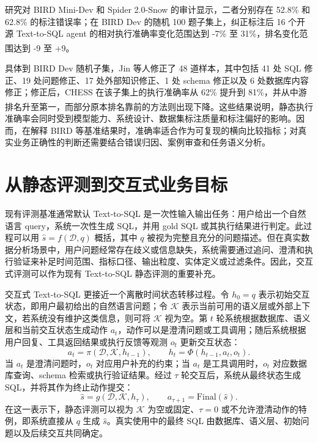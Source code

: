 \documentclass[
    bachelor,
    pdflinks,
]{xjtuthesis}
\newcommand{\upcite}[1]{\textsuperscript{\cite{#1}}}
\begin{document}
研究对 BIRD Mini-Dev 和 Spider 2.0-Snow 的审计显示，二者分别存在 52.8\% 和 62.8\% 的标注错误率；在 BIRD Dev 的随机 100 题子集上，纠正标注后 16 个开源 Text-to-SQL agent 的相对执行准确率变化范围达到 -7\% 至 31\%，排名变化范围达到 -9 至 +9\upcite{jin2026annotationErrors}。

具体到 BIRD Dev 随机子集，Jin 等人修正了 48 道样本，其中包括 41 处 SQL 修正、19 处问题修正、17 处外部知识修正、1 处 schema 修正以及 6 处数据库内容修正；修正后，CHESS 在该子集上的执行准确率从 62\% 提升到 81\%，并从中游排名升至第一，而部分原本排名靠前的方法则出现下降\upcite{jin2026annotationErrors}。这些结果说明，静态执行准确率会同时受到模型能力、系统设计、数据集标注质量和标注偏好的影响。因而，在解释 BIRD 等基准结果时，准确率适合作为可复现的横向比较指标；对真实业务正确性的判断还需要结合错误归因、案例审查和任务语义分析。

\section{从静态评测到交互式业务目标}

现有评测基准通常默认 Text-to-SQL 是一次性输入输出任务：用户给出一个自然语言 query，系统一次性生成 SQL，并用 gold SQL 或其执行结果进行判定。此过程可以用 $\hat{s}=f(\mathcal{D},q)$ 概括，其中 $q$ 被视为完整且充分的问题描述。但在真实数据分析场景中，用户问题经常存在歧义或信息缺失，系统需要通过追问、澄清和执行验证来补足时间范围、指标口径、输出粒度、实体定义或过滤条件。因此，交互式评测可以作为现有 Text-to-SQL 静态评测的重要补充。

交互式 Text-to-SQL 更接近一个离散时间状态转移过程。令 $h_0=q$ 表示初始交互状态，即用户最初给出的自然语言问题；令 $\mathcal{K}$ 表示当前可用的语义层或外部上下文，若系统没有维护这类信息，则可将 $\mathcal{K}$ 视为空。第 $t$ 轮系统根据数据库、语义层和当前交互状态生成动作 $a_t$，动作可以是澄清问题或工具调用；随后系统根据用户回复、工具返回结果或执行反馈等观测 $o_t$ 更新交互状态：
\begin{equation}
a_t=\pi(\mathcal{D},\mathcal{K},h_{t-1}),\qquad
h_t=\Phi(h_{t-1},a_t,o_t).
\end{equation}
当 $a_t$ 是澄清问题时，$o_t$ 对应用户补充的约束；当 $a_t$ 是工具调用时，$o_t$ 对应数据库查询、schema 检索或执行验证结果。经过 $\tau$ 轮交互后，系统从最终状态生成 SQL，并将其作为终止动作提交：
\begin{equation}
\hat{s}=g(\mathcal{D},\mathcal{K},h_{\tau}),\qquad
a_{\tau+1}=\mathrm{Final}(\hat{s}).
\end{equation}
在这一表示下，静态评测可以视为 $\mathcal{K}$ 为空或固定、$\tau=0$ 或不允许澄清动作的特例，即系统直接从 $q$ 生成 $\hat{s}$。真实使用中的最终 SQL 由数据库、语义层、初始问题以及后续交互共同确定。
\end{document}
